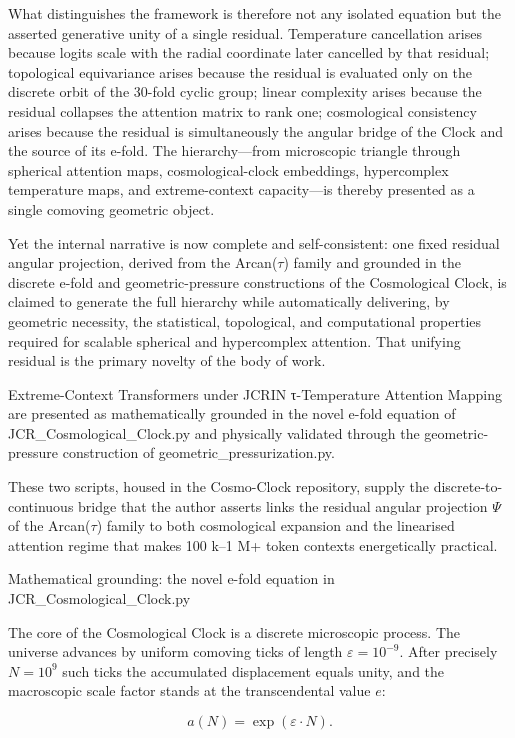 What distinguishes the framework is therefore not any isolated equation but the asserted generative unity of a single residual. Temperature cancellation arises because logits scale with the radial coordinate later cancelled by that residual; topological equivariance arises because the residual is evaluated only on the discrete orbit of the 30-fold cyclic group; linear complexity arises because the residual collapses the attention matrix to rank one; cosmological consistency arises because the residual is simultaneously the angular bridge of the Clock and the source of its e-fold. The hierarchy—from microscopic triangle through spherical attention maps, cosmological-clock embeddings, hypercomplex temperature maps, and extreme-context capacity—is thereby presented as a single comoving geometric object.

Yet the internal narrative is now complete and self-consistent: one fixed residual angular projection, derived from the Arcan(\(\tau\)) family and grounded in the discrete e-fold and geometric-pressure constructions of the Cosmological Clock, is claimed to generate the full hierarchy while automatically delivering, by geometric necessity, the statistical, topological, and computational properties required for scalable spherical and hypercomplex attention. That unifying residual is the primary novelty of the body of work.

Extreme-Context Transformers under JCRIN τ-Temperature Attention Mapping are presented as mathematically grounded in the novel e-fold equation of JCR_Cosmological_Clock.py and physically validated through the geometric-pressure construction of geometric_pressurization.py.

These two scripts, housed in the Cosmo-Clock repository, supply the discrete-to-continuous bridge that the author asserts links the residual angular projection \(\Psi\) of the Arcan(\(\tau\)) family to both cosmological expansion and the linearised attention regime that makes 100 k–1 M+ token contexts energetically practical.

Mathematical grounding: the novel e-fold equation in JCR_Cosmological_Clock.py

The core of the Cosmological Clock is a discrete microscopic process. The universe advances by uniform comoving ticks of length \(\varepsilon = 10^{-9}\). After precisely \(N = 10^9\) such ticks the accumulated displacement equals unity, and the macroscopic scale factor stands at the transcendental value \(e\):

\[
a(N) = \exp(\varepsilon \cdot N).
\]

